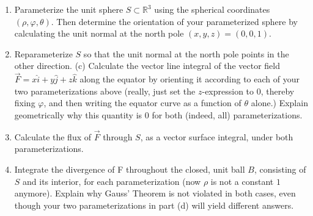 \documentclass[openany]{book}
\begin{document}
\begin{prob}
    \begin{enumerate}
        \item[(a)] Parameterize the unit sphere $S \subset \mathbb{R}^3$ using the spherical coordinates $(\rho, \varphi, \theta)$. Then determine the orientation of your parameterized sphere by calculating the unit normal at the north pole $(x, y, z) = (0, 0, 1)$.
        
        \item[(b)] Reparameterize $S$ so that the unit normal at the north pole points in the other direction. (c) Calculate the vector line integral of the vector field $\vec{F} = x\hat{i} + y\hat{j} + z\hat{k}$ along the equator by orienting it according to each of your two parameterizations above (really, just set the $z$-expression to $0$, thereby fixing $\varphi$, and then writing the equator curve as a function of $\theta$ alone.) Explain geometrically why this quantity is $0$ for both (indeed, all) parameterizations.
        
        \item[(c)] Calculate the flux of $\vec{F}$ through $S$, as a vector surface integral, under both parameterizations.
        
        \item[(d)] Integrate the divergence of F throughout the closed, unit ball $B$, consisting of $S$ and its interior, for each parameterization (now $\rho$ is not a constant $1$ anymore). Explain why Gauss' Theorem is not violated in both cases, even though your two parameterizations in part (d) will yield different answers.
    \end{enumerate}
\end{prob}
\end{document}
